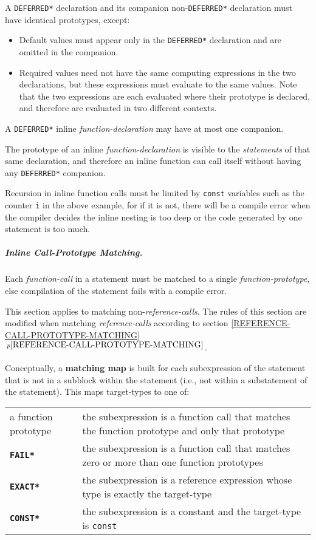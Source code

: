 \documentclass[12pt]{article}
\newcommand{\subsubsubsubsection}[1]{\subparagraph[#1]{#1.}}
\newcommand{\key}[1]{{\rm \bfseries #1}}
\newcommand{\ttkey}[1]{{\tt \bfseries #1}}
\newcommand{\itemref}[1]{\ref{#1}$\,^{p\pageref{#1}}$}
\begin{document}
A {\tt *DEFERRED*} declaration and its companion non-{\tt *DEFERRED*}
declaration must have identical prototypes, except:
\label{COMPANION-DECLARATION}
\begin{itemize}
\item Default values must appear only in the {\tt *DEFERRED*} declaration
and are omitted in the companion.
\item Required values need not have the same computing expressions
in the two declarations, but these expressions must evaluate to the
same values.  Note that the two expressions are each evaluated where
their prototype is declared, and therefore are evaluated in
two different contexts.
\end{itemize}

A {\tt *DEFERRED*} inline {\em function-declaration} may have at
most one companion.

The prototype of an inline {\em function-declaration} is visible
to the {\em statements} of that same declaration, and therefore
an inline function can call itself without having any {\tt *DEFERRED*}
companion.

Recursion in inline function calls must be limited by {\tt const}
variables such as the counter {\tt i} in the above example,
for if it is not, there
will be a compile error when the compiler decides the inline nesting
is too deep or the code generated by one statement is too much.

\subsubsubsubsection{Inline Call-Prototype Matching}
\label{INLINE-CALL-PROTOTYPE-MATCHING}

Each {\em function-call} in a statement must be matched to a single
{\em function-prototype}, else compilation of the statement fails
with a compile error.

This section applies to matching non-{\em reference-calls}.  The
rules of this section are modified when matching {\em reference-calls}
according to section \itemref{REFERENCE-CALL-PROTOTYPE-MATCHING}.

Conceptually, a \key{matching map} is built for each subexpression
of the statement that is not in a subblock within the statement
(i.e., not within a substatement of the statement).
This maps target-types to one of:
\begin{center}
\begin{tabular}{lp{4.0in}}
a function prototype	& the subexpression is a function call that
			  matches the function prototype and only
			  that prototype
\\[1ex]
\ttkey{*FAIL*}		& the subexpression is a function call that
                          matches zero or more than one function
			  prototypes
\\[1ex]
\ttkey{*EXACT*}		& the subexpression is a reference expression
			  whose type is exactly the target-type
\\[1ex]
\ttkey{*CONST*}		& the subexpression is a constant and the
			  target-type is {\tt const}

\end{tabular}
\end{center}
\end{document}
